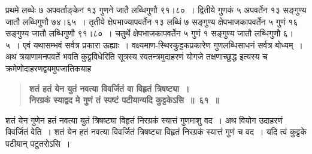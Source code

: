 \documentclass[11pt, openany]{book}
\begin{document}
\newpage

\begin{sloppypar}
\noindent प्रथमे लब्धेः ७ अपवर्ताङ्केन १३ गुणने जातै लब्धिगुणौ ९१।८०~। द्वितीये गुणकं ५ अपवर्तेन १३ सङ्गुण्य जातौ लब्धिगुणौ ७४।६५~। तृतीये क्षेपभाज्यापवर्तेन १३ लब्धिं ७ सङ्गुण्य क्षेपभाजकापवर्तेन ५ गुणं १६ सङ्गुण्य जातौ लब्धिगुणौ ९१।८०~। चतुर्थे क्षेपभाजकापवर्तेन ५ गुणं १ सङ्गुण्य जातौ लब्धिगुणौ ६।५~। एवं यथासम्भवं सर्वत्र प्रकारा ऊह्याः~। वक्ष्यमाण-स्थिरकुट्टकप्रकारेण गुणलब्धिसाधनं सर्वत्र बोध्यम्~। \\

{\small अथ त्रयाणामनपवर्ते भवति कुट्टविधेरिति सूत्रस्य स्वतन्त्रमुदाहरणं योगजे तक्षणाच्छुद्ध इत्यस्य च क्रमेणोदाहरणद्वयमुपजातिकयाह\textendash }

 \label{5.61}
\begin{quote}
{\large \textbf{{\color{purple}शतं हतं येन युतं नवत्या विवर्जितं वा विहृतं त्रिषष्ट्या~।\\
निरग्रकं स्याद्वद मे गुणं तं स्पष्टं पटीयान्यदि कुट्टकेऽसि~॥~६१~॥}}}
\end{quote}

शतं येन गुणेन हतं नवत्या युतं त्रिषष्ट्या विहृतं निरग्रकं स्यात्तं गुणमाशु वद~। अथ वियोग उदाहरणं विवर्जितं वेति~। शतं येन हतं नवत्या विवर्जितं त्रिषष्ट्या विहृतं निरग्रकं स्यात्तं गुणं च वद~। यदि त्वं कुट्टके पटीयान् पटुतरोऽसि~। \\


\end{sloppypar}
\end{document}
